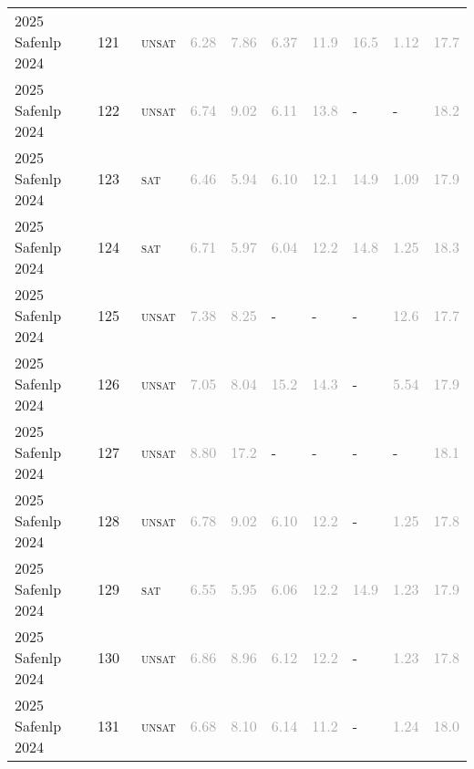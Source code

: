\begin{center}
{\begin{longtable}{@{}llllllllll@{}}
2025 Safenlp 2024 & 121 & ~\textsc{unsat} & \textcolor{darkgray}{6.28} & \textcolor{darkgray}{7.86} & \textcolor{darkgray}{6.37} & \textcolor{darkgray}{11.9} & \textcolor{darkgray}{16.5} & \textcolor{darkgray}{1.12} & \textcolor{darkgray}{17.7} \\
2025 Safenlp 2024 & 122 & ~\textsc{unsat} & \textcolor{darkgray}{6.74} & \textcolor{darkgray}{9.02} & \textcolor{darkgray}{6.11} & \textcolor{darkgray}{13.8} & - & - & \textcolor{darkgray}{18.2} \\
2025 Safenlp 2024 & 123 & ~\textsc{sat} & \textcolor{darkgray}{6.46} & \textcolor{darkgray}{5.94} & \textcolor{darkgray}{6.10} & \textcolor{darkgray}{12.1} & \textcolor{darkgray}{14.9} & \textcolor{darkgray}{1.09} & \textcolor{darkgray}{17.9} \\
2025 Safenlp 2024 & 124 & ~\textsc{sat} & \textcolor{darkgray}{6.71} & \textcolor{darkgray}{5.97} & \textcolor{darkgray}{6.04} & \textcolor{darkgray}{12.2} & \textcolor{darkgray}{14.8} & \textcolor{darkgray}{1.25} & \textcolor{darkgray}{18.3} \\
2025 Safenlp 2024 & 125 & ~\textsc{unsat} & \textcolor{darkgray}{7.38} & \textcolor{darkgray}{8.25} & - & - & - & \textcolor{darkgray}{12.6} & \textcolor{darkgray}{17.7} \\
2025 Safenlp 2024 & 126 & ~\textsc{unsat} & \textcolor{darkgray}{7.05} & \textcolor{darkgray}{8.04} & \textcolor{darkgray}{15.2} & \textcolor{darkgray}{14.3} & - & \textcolor{darkgray}{5.54} & \textcolor{darkgray}{17.9} \\
2025 Safenlp 2024 & 127 & ~\textsc{unsat} & \textcolor{darkgray}{8.80} & \textcolor{darkgray}{17.2} & - & - & - & - & \textcolor{darkgray}{18.1} \\
2025 Safenlp 2024 & 128 & ~\textsc{unsat} & \textcolor{darkgray}{6.78} & \textcolor{darkgray}{9.02} & \textcolor{darkgray}{6.10} & \textcolor{darkgray}{12.2} & - & \textcolor{darkgray}{1.25} & \textcolor{darkgray}{17.8} \\
2025 Safenlp 2024 & 129 & ~\textsc{sat} & \textcolor{darkgray}{6.55} & \textcolor{darkgray}{5.95} & \textcolor{darkgray}{6.06} & \textcolor{darkgray}{12.2} & \textcolor{darkgray}{14.9} & \textcolor{darkgray}{1.23} & \textcolor{darkgray}{17.9} \\
2025 Safenlp 2024 & 130 & ~\textsc{unsat} & \textcolor{darkgray}{6.86} & \textcolor{darkgray}{8.96} & \textcolor{darkgray}{6.12} & \textcolor{darkgray}{12.2} & - & \textcolor{darkgray}{1.23} & \textcolor{darkgray}{17.8} \\
2025 Safenlp 2024 & 131 & ~\textsc{unsat} & \textcolor{darkgray}{6.68} & \textcolor{darkgray}{8.10} & \textcolor{darkgray}{6.14} & \textcolor{darkgray}{11.2} & - & \textcolor{darkgray}{1.24} & \textcolor{darkgray}{18.0} \\

\end{longtable}}
\end{center}
